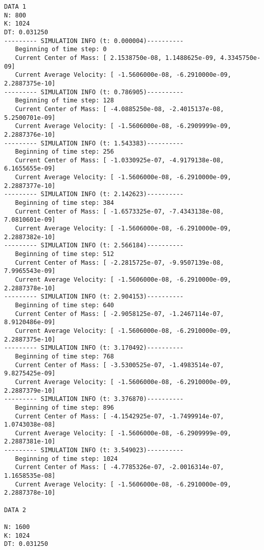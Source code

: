 \documentclass[11pt]{article}
\begin{document}
\begin{verbatim}
DATA 1
N: 800
K: 1024
DT: 0.031250
--------- SIMULATION INFO (t: 0.000004)----------
   Beginning of time step: 0
   Current Center of Mass: [ 2.1538750e-08, 1.1488625e-09, 4.3345750e-09]
   Current Average Velocity: [ -1.5606000e-08, -6.2910000e-09, 2.2887375e-10]
--------- SIMULATION INFO (t: 0.786905)----------
   Beginning of time step: 128
   Current Center of Mass: [ -4.0885250e-08, -2.4015137e-08, 5.2500701e-09]
   Current Average Velocity: [ -1.5606000e-08, -6.2909999e-09, 2.2887376e-10]
--------- SIMULATION INFO (t: 1.543383)----------
   Beginning of time step: 256
   Current Center of Mass: [ -1.0330925e-07, -4.9179138e-08, 6.1655655e-09]
   Current Average Velocity: [ -1.5606000e-08, -6.2910000e-09, 2.2887377e-10]
--------- SIMULATION INFO (t: 2.142623)----------
   Beginning of time step: 384
   Current Center of Mass: [ -1.6573325e-07, -7.4343138e-08, 7.0810601e-09]
   Current Average Velocity: [ -1.5606000e-08, -6.2910000e-09, 2.2887382e-10]
--------- SIMULATION INFO (t: 2.566184)----------
   Beginning of time step: 512
   Current Center of Mass: [ -2.2815725e-07, -9.9507139e-08, 7.9965543e-09]
   Current Average Velocity: [ -1.5606000e-08, -6.2910000e-09, 2.2887378e-10]
--------- SIMULATION INFO (t: 2.904153)----------
   Beginning of time step: 640
   Current Center of Mass: [ -2.9058125e-07, -1.2467114e-07, 8.9120486e-09]
   Current Average Velocity: [ -1.5606000e-08, -6.2910000e-09, 2.2887375e-10]
--------- SIMULATION INFO (t: 3.170492)----------
   Beginning of time step: 768
   Current Center of Mass: [ -3.5300525e-07, -1.4983514e-07, 9.8275425e-09]
   Current Average Velocity: [ -1.5606000e-08, -6.2910000e-09, 2.2887379e-10]
--------- SIMULATION INFO (t: 3.376870)----------
   Beginning of time step: 896
   Current Center of Mass: [ -4.1542925e-07, -1.7499914e-07, 1.0743038e-08]
   Current Average Velocity: [ -1.5606000e-08, -6.2909999e-09, 2.2887381e-10]
--------- SIMULATION INFO (t: 3.549023)----------
   Beginning of time step: 1024
   Current Center of Mass: [ -4.7785326e-07, -2.0016314e-07, 1.1658535e-08]
   Current Average Velocity: [ -1.5606000e-08, -6.2910000e-09, 2.2887378e-10]

DATA 2

N: 1600
K: 1024
DT: 0.031250


\end{verbatim}
\end{document}

